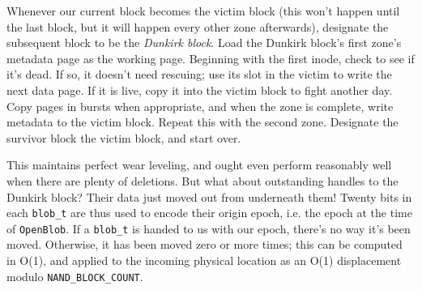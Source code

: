 \documentclass[letterpaper,10pt]{article}
\begin{document}
Whenever our current block becomes the victim block (this won't happen until the
last block, but it will happen every other zone afterwards), designate the subsequent
block to be the \textit{Dunkirk block}. Load the Dunkirk block's first zone's
metadata page as the working page. Beginning with the first inode, check to
see if it's dead. If so, it doesn't need rescuing; use its slot in the victim
to write the next data page. If it is live, copy it into the victim block to
fight another day. Copy pages in bursts when appropriate, and when the zone is
complete, write metadata to the victim block. Repeat this with the second zone.
Designate the survivor block the victim block, and start over.

This maintains perfect wear leveling, and ought even perform reasonably well
when there are plenty of deletions. But what about outstanding handles to the
Dunkirk block? Their data just moved out from underneath them! Twenty bits in
each \texttt{blob\_t} are thus used to encode their origin epoch, i.e. the epoch
at the time of \texttt{OpenBlob}. If a \texttt{blob\_t} is handed to us with
our epoch, there's no way it's been moved. Otherwise, it has been moved zero or
more times; this can be computed in O(1), and applied to the incoming physical
location as an O(1) displacement modulo \texttt{NAND\_BLOCK\_COUNT}.
\end{document}
